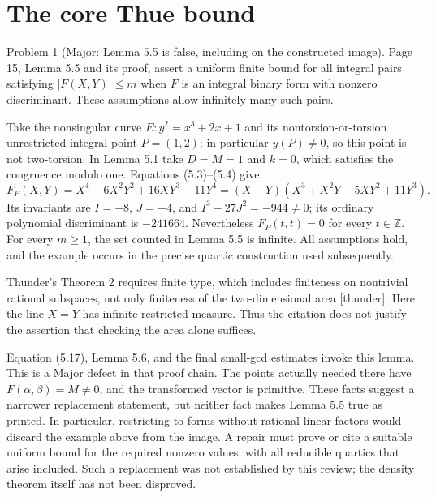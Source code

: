 \documentclass[10pt]{article}
\begin{document}
\section*{The core Thue bound}
Problem 1 (Major: Lemma 5.5 is false, including on the constructed image).  Page 15, Lemma 5.5 and its proof, assert a uniform finite bound for all integral pairs satisfying \(|F(X,Y)|\leq m\) when \(F\) is an integral binary form with nonzero discriminant. These assumptions allow infinitely many such pairs.\par
Take the nonsingular curve \(E:y^2=x^3+2x+1\) and its nontorsion-or-torsion unrestricted integral point \(P=(1,2)\); in particular \(y(P)\neq0\), so this point is not two-torsion. In Lemma 5.1 take \(D=M=1\) and \(k=0\), which satisfies the congruence modulo one. Equations (5.3)–(5.4) give \[F_P(X,Y)=X^4-6X^2Y^2+16XY^3-11Y^4
 =(X-Y)(X^3+X^2Y-5XY^2+11Y^3).\] Its invariants are \(I=-8\), \(J=-4\), and \(I^3-27J^2=-944\neq0\); its ordinary polynomial discriminant is \(-241664\). Nevertheless \(F_P(t,t)=0\) for every \(t\in\mathbb Z\). For every \(m\geq1\), the set counted in Lemma 5.5 is infinite. All assumptions hold, and the example occurs in the precise quartic construction used subsequently.\par
Thunder’s Theorem 2 requires finite type, which includes finiteness on nontrivial rational subspaces, not only finiteness of the two-dimensional area [thunder]. Here the line \(X=Y\) has infinite restricted measure. Thus the citation does not justify the assertion that checking the area alone suffices.\par
Equation (5.17), Lemma 5.6, and the final small-gcd estimates invoke this lemma. This is a Major defect in that proof chain. The points actually needed there have \(F(\alpha,\beta)=M\neq0\), and the transformed vector is primitive. These facts suggest a narrower replacement statement, but neither fact makes Lemma 5.5 true as printed. In particular, restricting to forms without rational linear factors would discard the example above from the image. A repair must prove or cite a suitable uniform bound for the required nonzero values, with all reducible quartics that arise included. Such a replacement was not established by this review; the density theorem itself has not been disproved.\par
\end{document}
